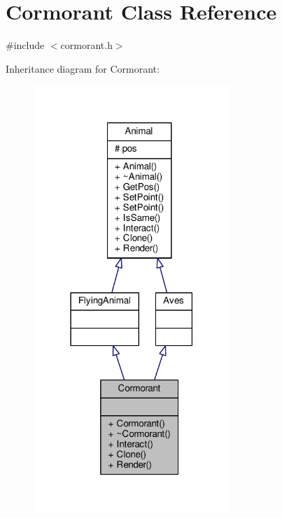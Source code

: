 \hypertarget{classCormorant}{}\section{Cormorant Class Reference}
\label{classCormorant}


{\ttfamily \#include $<$cormorant.\+h$>$}



Inheritance diagram for Cormorant\+:
\nopagebreak
\begin{figure}[H]
\begin{center}
\leavevmode
\includegraphics[width=210pt]{classCormorant__inherit__graph}
\end{center}
\end{figure}


